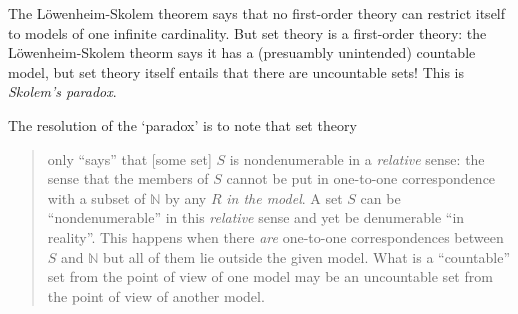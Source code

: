 The L\"owenheim-Skolem theorem says that no first-order theory can restrict itself to models of one infinite cardinality.  But set theory is a  first-order theory: the L\"owenheim-Skolem theorm says it has a (presuambly unintended) countable model, but set theory itself entails that there are uncountable sets! This is \emph{Skolem's paradox}.

The resolution of the `paradox' is to note that set theory \begin{quotation}
	 only ``says'' that [some set] $S$ is nondenumerable in a \emph{relative} sense: the sense that the members of $S$ cannot 
	be put in one-to-one correspondence with a subset of $\mathbb{N}$ by any $R$ \emph{in the model}. 
	A set $S$ can be ``nondenumerable'' in this \emph{relative} sense and yet be denumerable 
	``in reality''. This happens when there \emph{are} one-to-one correspondences between 
	$S$ and $\mathbb{N}$ but all of them lie outside the given model. What is a ``countable'' set 
	from the point of view of one model may be an uncountable set from the point of 
	view of another model.  \citep[465]{putmodre}
\end{quotation}



% 

